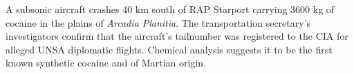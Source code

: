 A subsonic aircraft crashes 40 km south of RAP Starport carrying 3600 kg of cocaine in the plains of {\it Arcadia Planitia}. The transportation secretary's investigators confirm that the aircraft's tailnumber was registered to the CIA for alleged UNSA diplomatic flights. Chemical analysis suggests it to be the first known synthetic cocaine and of Martian origin.
\StopTimelineDate






